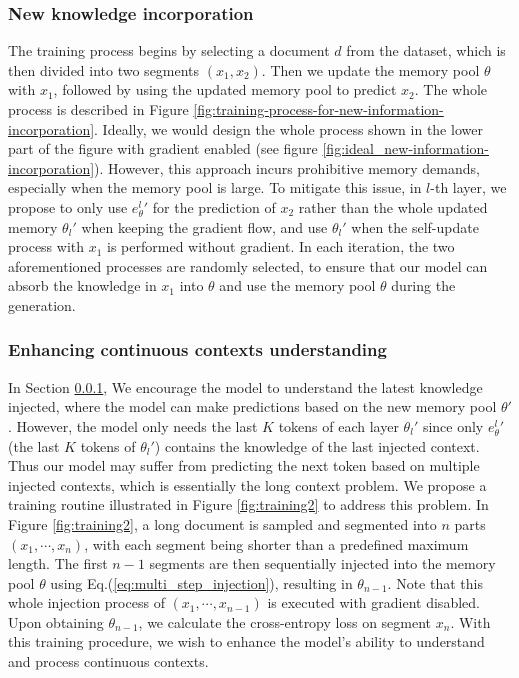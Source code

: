 \subsubsection{New knowledge incorporation}
\label{ssub:newest_information_incorporation}
The training process begins by selecting a document $d$ from the dataset, which is then divided into two segments $(x_1, x_2)$. 
Then we update the memory pool $\theta$ with $x_1$, followed by using the updated memory pool to predict $x_2$. 
The whole process is described in Figure \ref{fig:training-process-for-new-information-incorporation}. Ideally, we would design the whole process shown in the lower part of the figure with gradient enabled (see figure \ref{fig:ideal_new-information-incorporation}). 
However, this approach incurs prohibitive memory demands, especially when the memory pool is large. To mitigate this issue,
in $l$-th layer, we propose to only use ${e_\theta^l}'$ for the prediction of $x_2$ rather than the whole updated memory $\theta_l'$ when keeping the gradient flow, and use $\theta_l'$ when the self-update process with $x_1$ is performed without gradient.
In each iteration, the two aforementioned processes are randomly selected, to ensure that our model can absorb the knowledge in $x_1$ into $\theta$ and use the memory pool $\theta$ during the generation. 
\subsubsection{Enhancing continuous contexts understanding} 
\label{ssub:enhancing_continuous_contexts_understanding}
In Section \ref{ssub:newest_information_incorporation}, 
We encourage the model to understand the latest knowledge injected, where the model can make predictions based on the new memory pool $\theta'$. 
However, the model only needs the last $K$ tokens of each layer $\theta_l'$ since only ${e_\theta^{l}}'$ (the last $K$ tokens of $\theta_l'$) contains the knowledge of the last injected context. 
Thus our model may suffer from predicting the next token based on multiple injected contexts, which is essentially the long context problem. 
We propose a training routine illustrated in Figure \ref{fig:training2} to address this problem. In Figure \ref{fig:training2}, a long document is sampled and segmented into $n$ parts $(x_1, \cdots, x_n)$, with each segment being shorter than a predefined maximum length. 
The first $n-1$ segments are then sequentially injected into the memory pool $\theta$ using Eq.(\ref{eq:multi_step_injection}), resulting in $\theta_{n-1}$.
Note that this whole injection process of $(x_1, \cdots, x_{n-1})$ is executed with gradient disabled. 
Upon obtaining $\theta_{n-1}$, we calculate the cross-entropy loss on segment $x_n$. With this training procedure, we wish to enhance the model's ability to understand and process continuous contexts.


